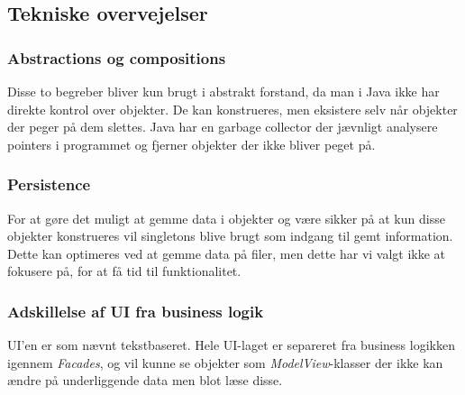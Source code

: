 \subsection{Tekniske overvejelser}
\subsubsection{Abstractions og compositions}
Disse to begreber bliver kun brugt i abstrakt forstand, da man i Java ikke har direkte kontrol over objekter. De kan konstrueres, men eksistere selv når objekter der peger på dem slettes. Java har en garbage collector der jævnligt analysere pointers i programmet og fjerner objekter der ikke bliver peget på.
\subsubsection{Persistence}
For at gøre det muligt at gemme data i objekter og være sikker på at kun disse objekter konstrueres vil singletons blive brugt som indgang til gemt information. Dette kan optimeres ved at gemme data på filer, men dette har vi valgt ikke at fokusere på, for at få tid til funktionalitet.
\subsubsection{Adskillelse af UI fra business logik}
UI'en er som nævnt tekstbaseret. Hele UI-laget er separeret fra business logikken igennem \textit{Facades}, og vil kunne se objekter som \textit{ModelView}-klasser der ikke kan ændre på underliggende data men blot læse disse.
